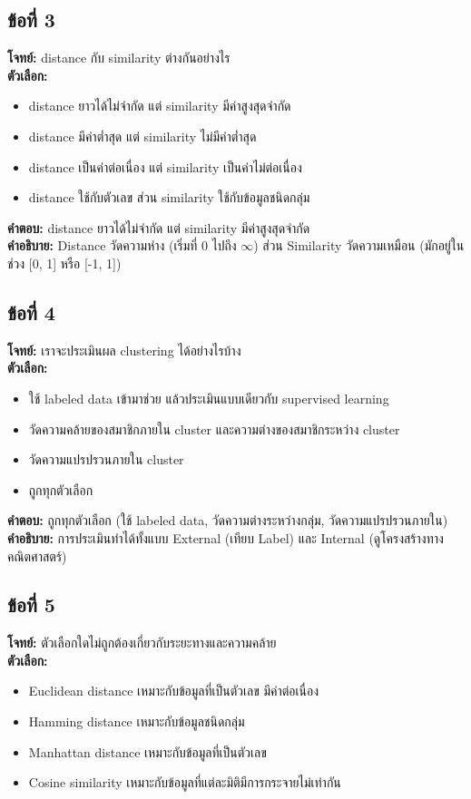 \documentclass[12pt]{article}
\begin{document}
\subsection*{ข้อที่ 3}
\textbf{โจทย์:} distance กับ similarity ต่างกันอย่างไร\\
\textbf{ตัวเลือก:}
\begin{itemize}
    \item distance ยาวได้ไม่จำกัด แต่ similarity มีค่าสูงสุดจำกัด
    \item distance มีค่าต่ำสุด แต่ similarity ไม่มีค่าต่ำสุด
    \item distance เป็นค่าต่อเนื่อง แต่ similarity เป็นค่าไม่ต่อเนื่อง
    \item distance ใช้กับตัวเลข ส่วน similarity ใช้กับข้อมูลชนิดกลุ่ม
\end{itemize}

\textbf{คำตอบ:} distance ยาวได้ไม่จำกัด แต่ similarity มีค่าสูงสุดจำกัด\\
\textbf{คำอธิบาย:} Distance วัดความห่าง (เริ่มที่ 0 ไปถึง $\infty$) ส่วน Similarity วัดความเหมือน (มักอยู่ในช่วง [0, 1] หรือ [-1, 1])

\subsection*{ข้อที่ 4}
\textbf{โจทย์:} เราจะประเมินผล clustering ได้อย่างไรบ้าง\\
\textbf{ตัวเลือก:}
\begin{itemize}
    \item ใช้ labeled data เข้ามาช่วย แล้วประเมินแบบเดียวกับ supervised learning
    \item วัดความคล้ายของสมาชิกภายใน cluster และความต่างของสมาชิกระหว่าง cluster
    \item วัดความแปรปรวนภายใน cluster
    \item ถูกทุกตัวเลือก
\end{itemize}

\textbf{คำตอบ:} ถูกทุกตัวเลือก (ใช้ labeled data, วัดความต่างระหว่างกลุ่ม, วัดความแปรปรวนภายใน)\\
\textbf{คำอธิบาย:} การประเมินทำได้ทั้งแบบ External (เทียบ Label) และ Internal (ดูโครงสร้างทางคณิตศาสตร์)

\subsection*{ข้อที่ 5}
\textbf{โจทย์:} ตัวเลือกใดไม่ถูกต้องเกี่ยวกับระยะทางและความคล้าย\\
\textbf{ตัวเลือก:}
\begin{itemize}
    \item Euclidean distance เหมาะกับข้อมูลที่เป็นตัวเลข มีค่าต่อเนื่อง
    \item Hamming distance เหมาะกับข้อมูลชนิดกลุ่ม
    \item Manhattan distance เหมาะกับข้อมูลที่เป็นตัวเลข
    \item Cosine similarity เหมาะกับข้อมูลที่แต่ละมิติมีการกระจายไม่เท่ากัน
\end{itemize}
\end{document}
